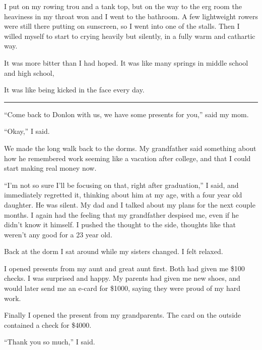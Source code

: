 I put on my rowing trou and a tank top, but on the way to the erg room the
heaviness in my throat won and I went to the bathroom.  A few lightweight
rowers were still there putting on sunscreen, so I went into one of the stalls.
Then I willed myself to start to crying heavily but silently, in a fully warm
and cathartic way.  

It was more bitter than I had hoped.  It was like many springs in middle school
and high school, 

It was like being kicked in the face every day.

\plainfancybreak{12pt}{2}{* * *}

``Come back to Donlon with us, we have some presents for you,'' said my mom. 

``Okay,'' I said.  

We made the long walk back to the dorms.  My grandfather said something about
how he remembered work seeming like a vacation after college, and that I could
start making real money now.

``I'm not so sure I'll be focusing on that, right after graduation,'' I said,
and immediately regretted it, thinking about him at my age, with a four year old
daughter.  He was silent.  My dad and I talked about my plans for the next
couple months.  I again had the feeling that my grandfather despised me, even if
he didn't know it himself.  I pushed the thought to the side, thoughts like that
weren't any good for a 23 year old.

Back at the dorm I sat around while my sisters changed.  I felt relaxed.

I opened presents from my aunt and great aunt first.  Both had given me \$100
checks.  I was surprised and happy.  My parents had given me new shoes, and
would later send me an e-card for \$1000, saying they were proud of my hard
work.  

Finally I opened the present from my grandparents.  The card on the outside
contained a check for \$4000.  

``Thank you so much,'' I said.
